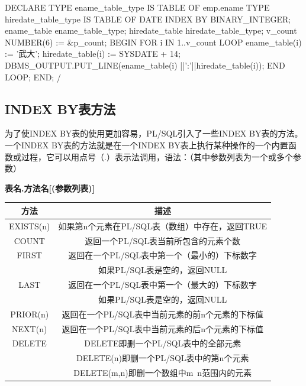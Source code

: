 \documentclass[11pt, a4paper, oneside, UTF8]{ctexbook}
\let\kaishu\relax %
\begin{document}
\begin{plsql}[caption=INDEX BY表使用示例2]
DECLARE
  TYPE ename_table_type IS TABLE OF emp.ename%
  TYPE hiredate_table_type IS TABLE OF DATE INDEX BY BINARY_INTEGER;
  ename_table ename_table_type;
  hiredate_table hiredate_table_type;
  v_count NUMBER(6) := &p_count;
BEGIN 
  FOR i IN 1..v_count LOOP 
  ename_table(i) := '武大';
  hiredate_table(i) := SYSDATE + 14;
  DBMS_OUTPUT.PUT_LINE(ename_table(i) ||':'||hiredate_table(i));
  END LOOP;
END;
/
\end{plsql}

\subsection{INDEX BY表方法}
为了使INDEX BY表的使用更加容易，PL/SQL引入了一些INDEX BY表的方法。一个INDEX BY表的方法就是在一个INDEX BY表上执行某种操作的一个内置函数或过程，它可以用点号（.）表示法调用，语法：（其中参数列表为一个或多个参数）

{\bfseries\kaishu 表名.方法名[(参数列表)]}

\begin{center}
  \begin{minipage}{\textwidth}
    \centering
    \begin{tabular}{|c|c|} 
      \hline %
      \textbf{方法} & \textbf{描述}  \\
      \hline
      EXISTS(n)  & 如果第n个元素在PL/SQL表（数组）中存在，返回TRUE \\
      \hline
      COUNT & 返回一个PL/SQL表当前所包含的元素个数 \\
      \hline
      FIRST & 返回在一个PL/SQL表中第一个（最小的）下标数字\\
            & 如果PL/SQL表是空的，返回NULL\\
            \hline
      LAST &返回在一个PL/SQL表中第一个（最大的）下标数字\\
          & 如果PL/SQL表是空的，返回NULL\\
          \hline
      PRIOR(n) & 返回在一个PL/SQL表中当前元素的前n个元素的下标值\\
      \hline
      NEXT(n) & 返回在一个PL/SQL表中当前元素的后n个元素的下标值\\
      \hline
      DELETE & DELETE即删一个PL/SQL表中的全部元素\\
            & DELETE(n)即删一个PL/SQL表中的第n个元素\\
            & DELETE(m,n)即删一个数组中m~n范围内的元素\\
      \hline
    \end{tabular}
    \captionsetup{hypcap=false}
    \label{tab:INDEX BY表方法表} %
  \end{minipage}
\end{center}
\end{document}
